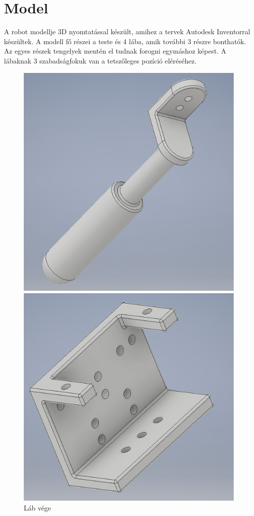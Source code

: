 \documentclass{article}
\begin{document}
\section{Model}
A robot modellje 3D nyomtatással készült, amihez a tervek Autodesk Inventorral készültek. A modell fő részei a teste és 4 lába, amik további 3 részre bonthatók. Az egyes részek tengelyek mentén el tudnak forogni egymáshoz képest. A lábaknak 3 szabadságfokuk van a tetszőleges pozíció eléréséhez.
\begin{figure}
	\centering
	\begin{minipage}{0.3\textwidth}
		\centering
		\includegraphics[width=\textwidth]{labveg}
		\caption{Láb vége}
	\end{minipage}\hfill
	\begin{minipage}{0.3\textwidth}
		\centering
		\includegraphics[width=\textwidth]{motortarto}

\end{minipage}
\end{figure}
\end{document}

